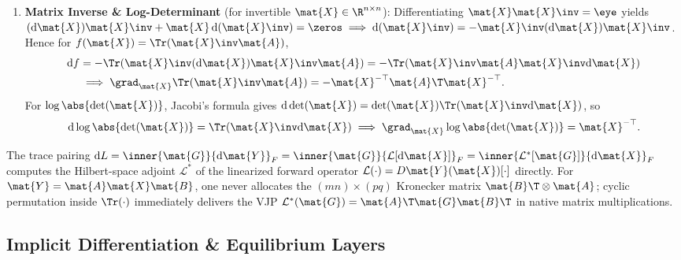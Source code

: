 \documentclass[../../../../master.tex]{subfiles}
\begin{document}
\begin{coremath}
\begin{enumerate}[leftmargin=1.6em]
  \item \textbf{Matrix Inverse \& Log-Determinant} (for invertible $\mat{X} \in \R^{n\times n}$):
        Differentiating $\mat{X}\mat{X}\inv = \eye$ yields $(\mathrm{d}\mat{X})\mat{X}\inv + \mat{X}\,\mathrm{d}(\mat{X}\inv) = \zeros \implies \mathrm{d}(\mat{X}\inv) = -\mat{X}\inv(\mathrm{d}\mat{X})\mat{X}\inv$. Hence for $f(\mat{X}) = \Tr(\mat{X}\inv \mat{A})$,
        \begin{equation}
        \begin{aligned}
          \mathrm{d}f &= -\Tr(\mat{X}\inv (\mathrm{d}\mat{X}) \mat{X}\inv \mat{A})
          = -\Tr(\mat{X}\inv \mat{A} \mat{X}\inv \mathrm{d}\mat{X}) \\
          &\implies \grad_{\mat{X}} \Tr(\mat{X}\inv\mat{A}) = -\mat{X}^{-\top}\mat{A}\T\mat{X}^{-\top}.
        \end{aligned}
          \label{eq:matcalc:grad_inv}
        \end{equation}
        For $\log\abs{\det(\mat{X})}$, Jacobi's formula gives $\mathrm{d}\det(\mat{X}) = \det(\mat{X})\Tr(\mat{X}\inv \mathrm{d}\mat{X})$, so
        \begin{equation}
          \mathrm{d}\log\abs{\det(\mat{X})} = \Tr(\mat{X}\inv \mathrm{d}\mat{X})
          \implies \grad_{\mat{X}} \log\abs{\det(\mat{X})} = \mat{X}^{-\top}.
          \label{eq:matcalc:grad_logdet}
        \end{equation}
\end{enumerate}
\end{coremath}

\begin{intuition}
The trace pairing $\mathrm{d}L = \inner{\mat{G}}{\mathrm{d}\mat{Y}}_F = \inner{\mat{G}}{\mathcal{L}[\mathrm{d}\mat{X}]}_F = \inner{\mathcal{L}^*[\mat{G}]}{\mathrm{d}\mat{X}}_F$ computes the Hilbert-space adjoint $\mathcal{L}^*$ of the linearized forward operator $\mathcal{L}(\cdot) = D\mat{Y}(\mat{X})[\cdot]$ directly. For $\mat{Y} = \mat{A}\mat{X}\mat{B}$, one never allocates the $(mn)\times(pq)$ Kronecker matrix $\mat{B}\T \otimes \mat{A}$; cyclic permutation inside $\Tr(\cdot)$ immediately delivers the VJP $\mathcal{L}^*(\mat{G}) = \mat{A}\T\mat{G}\mat{B}\T$ in native matrix multiplications.
\end{intuition}

\subsection{Implicit Differentiation \& Equilibrium Layers}
\label{subsec:matcalc:implicit}
\end{document}

